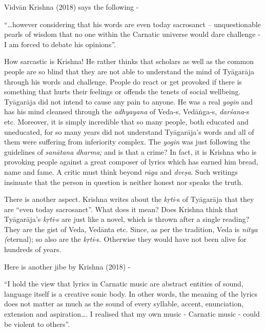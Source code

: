 Vidvān Krishna (2018) says the following -

\begin{myquote}
“…however considering that his words are even today sacrosanct – unquestionable pearls of wisdom that no one within the Carnatic universe would dare challenge - I am forced to debate his opinions”.
\end{myquote}

How sarcastic is Krishna! He rather thinks that scholars as well as the common people are so blind that they are not able to understand the mind of Tyāgarāja through his words and challenge. People do react or get provoked if there is something that hurts their feelings or offends the tenets of social wellbeing. Tyāgarāja did not intend to cause any pain to anyone. He was a real \textit{yogin} and has his mind cleansed through the \textit{adhyayana} of Veda-s, Vedāṅga-s, \textit{darśana}-s etc. Moreover, it is simply incredible that so many people, both educated and uneducated, for so many years did not understand Tyāgarāja’s words and all of them were suffering from inferiority complex. The \textit{yogin} was just following the guidelines of \textit{sanātana dharma;} and is that a crime? In fact, it is Krishna who is provoking people against a great composer of lyrics which has earned him bread, name and fame. A critic must think beyond \textit{rāga} and \textit{dveṣa}. Such writings insinuate that the person in question is neither honest nor speaks the truth. 

There is another aspect. Krishna writes about the \textit{kṛti}-s of Tyāgarāja that they are “even today sacrosanct”. What does it mean? Does Krishna think that Tyāgarāja’s \textit{kṛti}-s are just like a novel, which is thrown after a single reading? They are the gist of Veda, Vedānta etc. Since, as per the tradition, Veda is \textit{nitya (}eternal); so also are the \textit{kṛti}-s. Otherwise they would have not been alive for hundreds of years. 

Here is another jibe by Krishna (2018) -

\begin{myquote}
“I hold the view that lyrics in Carnatic music are abstract entities of sound, language itself is a creative sonic body. In other words, the meaning of the lyrics does not matter as much as the sound of every syllable, accent, enunciation, extension and aspiration…. I realised that my own music - Carnatic music - could be violent to others”.
\end{myquote}

